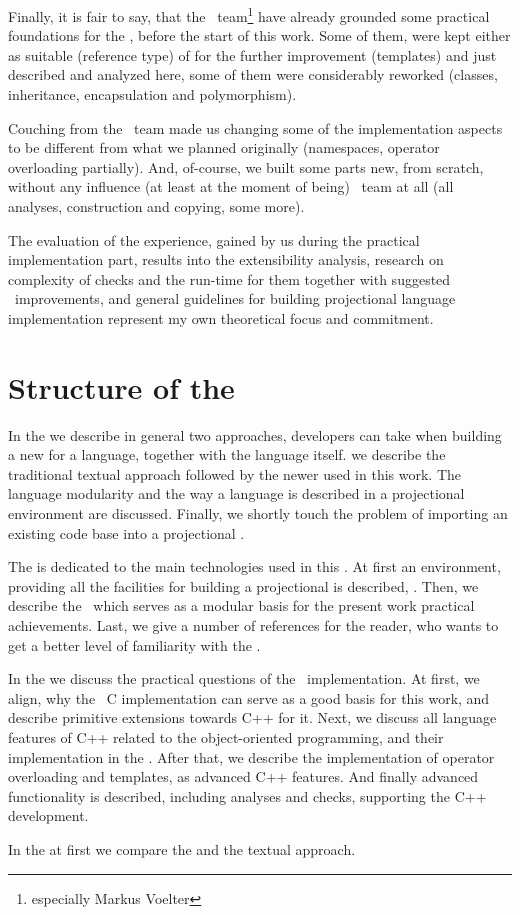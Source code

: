 \vspace{10 mm}
 
Finally, it is fair to say, that the \mbdr\ team\footnote{especially Markus Voelter} have already grounded some practical foundations for the \pcpp, 
before the start of this work. Some of them, were kept either as suitable (reference type) of for the further improvement (templates) and just described and analyzed 
here, some of them were considerably reworked (classes, inheritance, encapsulation and polymorphism). 

Couching from the \mbdr\ team made us changing some of the implementation aspects to be different from what we planned originally (namespaces,
operator overloading partially). And, of-course, we built some parts new, from scratch, without any influence (at least at the moment of being) \mbdr\ team 
at all (all analyses, construction and copying, some more). 

The evaluation of the experience, gained by us during the practical implementation part, results into the extensibility analysis, 
research on complexity of checks and the run-time for them together with suggested \jbmps\ improvements, and general guidelines 
for building projectional language implementation represent my own theoretical focus and commitment.

\section{Structure of the \MT}

In the  we describe in general two approaches,  developers can take when
building a new  for a language, together with the language itself. we describe the traditional 
textual approach followed by the newer  used in this work. The language 
modularity and the way a language is described in a projectional environment are discussed. Finally,
we shortly touch the problem of importing an existing code base into a projectional .

The  is dedicated to the main technologies used in this \MT. At first an environment, providing
all the facilities for building a projectional  is described, \jbmps. Then, we describe the \mbdp\
which serves as a modular basis for the present work practical achievements. Last, we give a number of 
references for the reader, who wants to get a better level of familiarity with the \cpppl.

In the  we discuss the practical questions of the \pcpp\ implementation. At first, we align,
why the \mbdr\ C implementation can serve as a good basis for this work, and describe primitive 
extensions towards C++ for it. Next, we discuss all language features of C++ related to the 
object-oriented programming, and their implementation in the \pcpp. After that, we describe the implementation
of operator overloading and templates, as advanced C++ features. And finally advanced \rg{ide} functionality
is described, including analyses and checks, supporting the C++ development.

In the  at first we compare the  and the textual approach.


